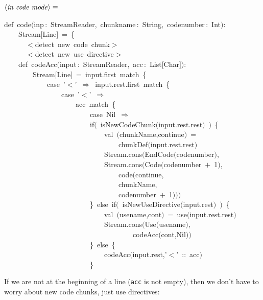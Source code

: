 \documentclass[a4paper,12pt]{article}
\begin{document}
$\left<\mbox{\emph{in code mode}}\right>\equiv$
\begin{program}{\vem def}~code$($inp\,{\rm :}~StreamReader,~chunkname\,{\rm :}~String,~codenumber\,{\rm :}~Int$)${\rm :}
\\~~~~Stream$[$Line$]$~=~{\small\{}
\\~~~~~~$<$detect~{\vem new}~code~chunk$>$
\\~~~~~~$<$detect~{\vem new}~use~directive$>$
\\~~~~{\vem def}~codeAcc$($input\,{\rm :}~StreamReader,~acc\,{\rm :}~List$[$Char$]$$)${\rm :}
\\~~~~~~~~Stream$[$Line$]$~=~input.first~{\vem match}~{\small\{}
\\~~~~~~~~~~~~{\vem case}~'$<$'~$\Rightarrow$~input.rest.first~{\vem match}~{\small\{}
\\~~~~~~~~~~~~~~~~{\vem case}~'$<$'~$\Rightarrow$
\\~~~~~~~~~~~~~~~~~~~~acc~{\vem match}~{\small\{}
\\~~~~~~~~~~~~~~~~~~~~~~~~{\vem case}~Nil~$\Rightarrow$
\\~~~~~~~~~~~~~~~~~~~~~~~~{\vem if}$($~isNewCodeChunk$($input.rest.rest$)$~$)$~{\small\{}
\\~~~~~~~~~~~~~~~~~~~~~~~~~~~~{\vem val}~$($chunkName,continue$)$~=
\\~~~~~~~~~~~~~~~~~~~~~~~~~~~~~~~~chunkDef$($input.rest.rest$)$
\\~~~~~~~~~~~~~~~~~~~~~~~~~~~~Stream.cons$($EndCode$($codenumber$)$,
\\~~~~~~~~~~~~~~~~~~~~~~~~~~~~Stream.cons$($Code$($codenumber~$+$~1$)$,
\\~~~~~~~~~~~~~~~~~~~~~~~~~~~~~~~~code$($continue,
\\~~~~~~~~~~~~~~~~~~~~~~~~~~~~~~~~chunkName,
\\~~~~~~~~~~~~~~~~~~~~~~~~~~~~~~~~codenumber~$+$~1$)$$)$$)$
\\~~~~~~~~~~~~~~~~~~~~~~~~{\small\}}~{\vem else}~{\vem if}$($~isNewUseDirective$($input.rest$)$~$)$~{\small\{}
\\~~~~~~~~~~~~~~~~~~~~~~~~~~~~{\vem val}~$($usename,cont$)$~=~use$($input.rest.rest$)$
\\~~~~~~~~~~~~~~~~~~~~~~~~~~~~Stream.cons$($Use$($usename$)$,
\\~~~~~~~~~~~~~~~~~~~~~~~~~~~~~~~~~~~~codeAcc$($cont,Nil$)$$)$
\\~~~~~~~~~~~~~~~~~~~~~~~~{\small\}}~{\vem else}~{\small\{}
\\~~~~~~~~~~~~~~~~~~~~~~~~~~~~codeAcc$($input.rest,'$<$'~{\rm :}{\rm :}~acc$)$
\\~~~~~~~~~~~~~~~~~~~~~~~~{\small\}}
\end{program}
If we are not at the beginning of a line (\texttt{acc} is not empty), then
we don't have to worry about new code chunks, just use directives:
\end{document}
